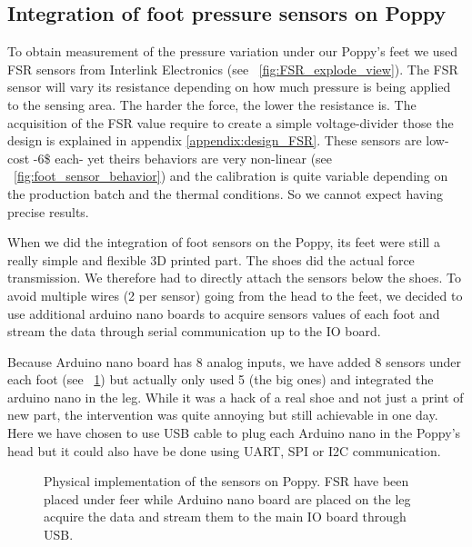 \subsection{Integration of foot pressure sensors on Poppy} %

To obtain measurement of the pressure variation under our Poppy's feet we used FSR sensors from Interlink Electronics (see \figurename~\ref{fig:FSR_explode_view}). The FSR sensor will vary its resistance depending on how much pressure is being applied to the sensing area. The harder the force, the lower the resistance is. The acquisition of the FSR value require to create a simple voltage-divider those the design is explained in appendix \ref{appendix:design_FSR}. These sensors are low-cost -6\$ each- yet theirs behaviors are very non-linear (see \figurename~\ref{fig:foot_sensor_behavior}) and the calibration is quite variable depending on the production batch and the thermal conditions. So we cannot expect having precise results.

When we did the integration of foot sensors on the Poppy, its feet were still a really simple and flexible 3D printed part. The shoes did the actual force transmission. We therefore had to directly attach the sensors below the shoes.
To avoid multiple wires (2 per sensor) going from the head to the feet, we decided to use additional arduino nano boards to acquire sensors values of each foot and stream the data through serial communication up to the IO board.

Because Arduino nano board has 8 analog inputs, we have added 8 sensors under each foot (see \figurename~\ref{fig:poppy_foot_sensors}) but actually only used 5 (the big ones) and integrated the arduino nano in the leg. While it was a hack of a real shoe and not just a print of new part, the intervention was quite annoying but still achievable in one day. Here we have chosen to use USB cable to plug each Arduino nano in the Poppy's head but it could also have be done using UART, SPI or I2C communication.

\begin{figure}[ht]
\centering
    \hfill
    \caption{Physical implementation of the sensors on Poppy. FSR have been placed under feer while Arduino nano board are placed on the leg acquire the data and stream them to the main IO board through USB.}
    \label{fig:poppy_foot_sensors}
\end{figure}


